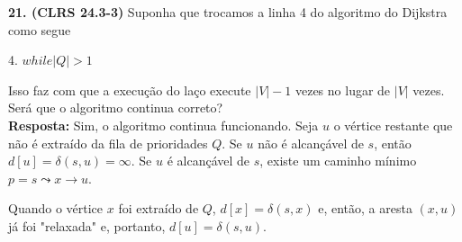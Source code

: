 
\noindent\textbf{21. (CLRS 24.3-3)} Suponha que trocamos a linha 4 do algoritmo do Dijkstra como segue
\begin{center}
4. $while|Q| > 1$
\end{center}
Isso faz com que a execução do laço execute $|V| - 1$ vezes no lugar de $|V|$ vezes. Será que o algoritmo continua correto?\\[6pt]
\textbf{Resposta:} Sim, o algoritmo continua funcionando. Seja $u$ o vértice restante que não é extraído da fila de prioridades $Q$. Se $u$ não é alcançável de $s$, então $d[u] = \delta(s, u) = \infty$. Se $u$ é alcançável de $s$, existe um caminho mínimo $p = s \leadsto x \rightarrow u$.

Quando o vértice $x$ foi extraído de $Q$, $d[x] = \delta(s, x)$ e, então, a aresta $(x, u)$ já foi "relaxada" e, portanto, $d[u] = \delta(s, u)$.\\[6pt]